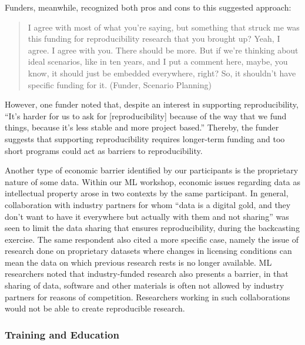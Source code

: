 \documentclass[authordate, meta]{jote-new-article}
\begin{document}
	Funders, meanwhile, recognized both pros and cons to this suggested approach:



	\begin{quote}I agree with most of what you're saying, but something that struck me was this funding for reproducibility research that you brought up? Yeah, I agree. I agree with you. There should be more. But if we're thinking about ideal scenarios, like in ten years, and I put a comment here, maybe, you know, it should just be embedded everywhere, right? So, it shouldn't have specific funding for it. (Funder, Scenario Planning)\end{quote}



	However, one funder noted that, despite an interest in supporting reproducibility, “It's harder for us to ask for [reproducibility] because of the way that we fund things, because it's less stable and more project based.” Thereby, the funder suggests that supporting reproducibility requires longer-term funding and too short programs could act as barriers to reproducibility.







	Another type of economic barrier identified by our participants is the proprietary nature of some data. Within our ML workshop, economic issues regarding data as intellectual property arose in two contexts by the same participant. In general, collaboration with industry partners for whom “data is a digital gold, and they don't want to have it everywhere but actually with them and not sharing” was seen to limit the data sharing that ensures reproducibility, during the backcasting exercise. The same respondent also cited a more specific case, namely the issue of research done on proprietary datasets where changes in licensing conditions can mean the data on which previous research rests is no longer available. ML researchers noted that industry-funded research also presents a barrier, in that sharing of data, software and other materials is often not allowed by industry partners for reasons of competition. Researchers working in such collaborations would not be able to create reproducible research.



	\subsubsection{Training and Education }
\end{document}
